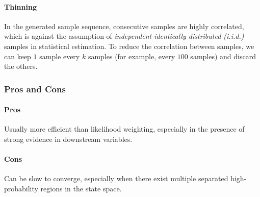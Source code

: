 \documentclass[10pt,UTF8]{article}
\theoremstyle{definition}
\newtheorem{definition inner}{Definition}[section]
\theoremstyle{definition}
\newtheorem{theorem inner}{Theorem}[section]
\theoremstyle{definition}
\newtheorem*{proof inner}{\textit{Proof}}
\theoremstyle{plain}
\newtheorem{tip inner}{Tip}[section]
\theoremstyle{remark}
\begin{document}
\paragraph*{Thinning}
In the generated sample sequence,
consecutive samples are highly correlated,
which is against the assumption of
\emph{independent identically distributed (i.i.d.)} samples
in statistical estimation.
To reduce the correlation between samples,
we can keep \(1\) sample every \(k\) samples
(for example, every \(100\) samples) and discard the others.

\subsubsection{Pros and Cons}

\paragraph*{Pros}
Usually more efficient than likelihood weighting,
especially in the presence of strong evidence in downstream variables.

\paragraph*{Cons}
Can be slow to converge,
especially when there exist multiple separated high-probability regions in the
state space.
\end{document}
